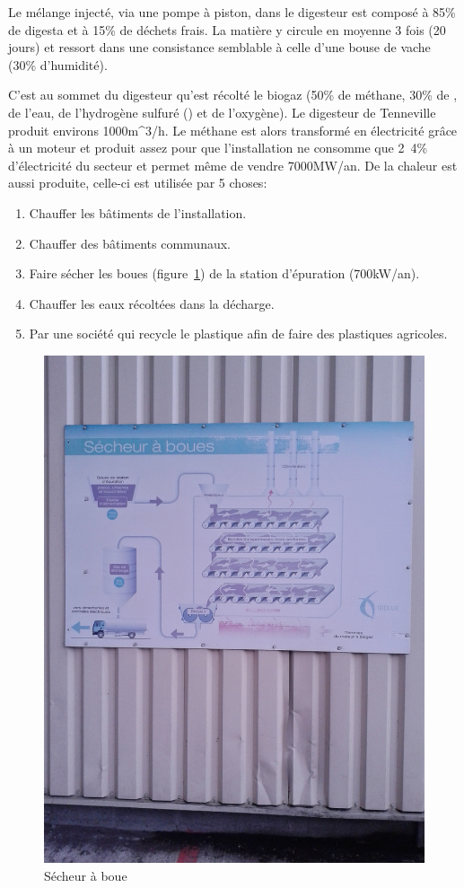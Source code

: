\documentclass{article}
\begin{document}
Le mélange injecté, via une pompe à piston, dans le digesteur est composé à \unit{85}{\%} de digesta et à \unit{15}{\%} de déchets frais. La matière y circule en moyenne 3 fois (20 jours) et ressort dans une consistance semblable à celle d'une bouse de vache (\unit{30}{\%} d'humidité).

C'est au sommet du digesteur qu'est récolté le biogaz (\unit{50}{\%} de méthane, \unit{30}{\%} de , de l'eau, de l'hydrogène sulfuré () et de l'oxygène). Le digesteur de Tenneville produit environs \unit{1000}{m^3/h}.
Le méthane est alors transformé en électricité grâce à un moteur et produit assez pour que l'installation ne consomme que \unit{2.4}{\%} d'électricité du secteur et permet même de vendre \unit{7000}{MW/an}. De la chaleur est aussi produite, celle-ci est utilisée par 5 choses:
\begin{enumerate}
\item Chauffer les bâtiments de l'installation.
\item Chauffer des bâtiments communaux.
\item Faire sécher les boues (figure~\ref{fig:Secheur}) de la station d'épuration (\unit{700}{kW/an}).
\item Chauffer les eaux récoltées dans la décharge.
\item Par une société qui recycle le plastique afin de faire des plastiques agricoles.
\end{enumerate}
\begin{figure}
  \centering
  \includegraphics[scale=0.07]{IMG_20141105_113638.jpg}
  \caption{Sécheur à boue}
  \label{fig:Secheur}
\end{figure}
\end{document}
